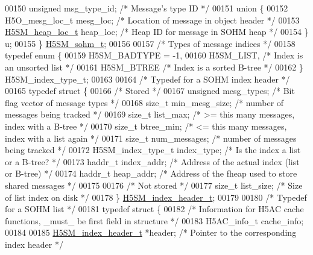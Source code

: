 \begin{DoxyCode}
00150     \textcolor{keywordtype}{unsigned} msg\_type\_id;               \textcolor{comment}{/* Message's type ID */}
00151     \textcolor{keyword}{union }\{
00152         H5O\_mesg\_loc\_t mesg\_loc;        \textcolor{comment}{/* Location of message in object header */}
00153         \hyperlink{struct_h5_s_m__heap__loc__t}{H5SM\_heap\_loc\_t} heap\_loc;       \textcolor{comment}{/* Heap ID for message in SOHM heap */}
00154     \} u;
00155 \} \hyperlink{struct_h5_s_m__sohm__t}{H5SM\_sohm\_t};
00156 
00157 \textcolor{comment}{/* Types of message indices */}
00158 \textcolor{keyword}{typedef} \textcolor{keyword}{enum} \{
00159     H5SM\_BADTYPE = -1,
00160     H5SM\_LIST,          \textcolor{comment}{/* Index is an unsorted list */}
00161     H5SM\_BTREE          \textcolor{comment}{/* Index is a sorted B-tree */}
00162 \} H5SM\_index\_type\_t;
00163 
00164 \textcolor{comment}{/* Typedef for a SOHM index header */}
00165 \textcolor{keyword}{typedef} \textcolor{keyword}{struct }\{
00166 \textcolor{comment}{/* Stored */}
00167     \textcolor{keywordtype}{unsigned} mesg\_types;    \textcolor{comment}{/* Bit flag vector of message types */}
00168     \textcolor{keywordtype}{size\_t} min\_mesg\_size;   \textcolor{comment}{/* number of messages being tracked */}
00169     \textcolor{keywordtype}{size\_t} list\_max;        \textcolor{comment}{/* >= this many messages, index with a B-tree */}
00170     \textcolor{keywordtype}{size\_t} btree\_min;       \textcolor{comment}{/* <= this many messages, index with a list again */}
00171     \textcolor{keywordtype}{size\_t} num\_messages;    \textcolor{comment}{/* number of messages being tracked */}
00172     H5SM\_index\_type\_t index\_type; \textcolor{comment}{/* Is the index a list or a B-tree? */}
00173     haddr\_t index\_addr;     \textcolor{comment}{/* Address of the actual index (list or B-tree) */}
00174     haddr\_t heap\_addr;      \textcolor{comment}{/* Address of the fheap used to store shared messages */}
00175 
00176 \textcolor{comment}{/* Not stored */}
00177     \textcolor{keywordtype}{size\_t} list\_size;           \textcolor{comment}{/* Size of list index on disk */}
00178 \} \hyperlink{struct_h5_s_m__index__header__t}{H5SM\_index\_header\_t};
00179 
00180 \textcolor{comment}{/* Typedef for a SOHM list */}
00181 \textcolor{keyword}{typedef} \textcolor{keyword}{struct }\{
00182     \textcolor{comment}{/* Information for H5AC cache functions, \_must\_ be first field in structure */}
00183     H5AC\_info\_t cache\_info;
00184 
00185     \hyperlink{struct_h5_s_m__index__header__t}{H5SM\_index\_header\_t} *header;    \textcolor{comment}{/* Pointer to the corresponding index header */}

\end{DoxyCode}
